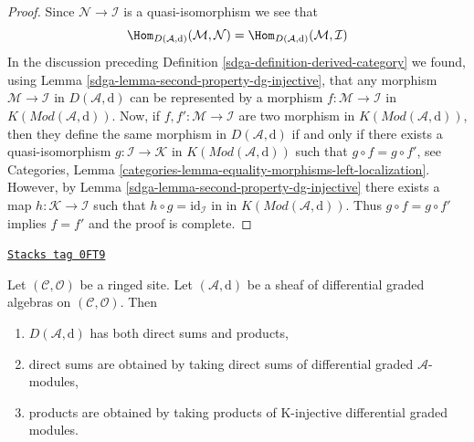 \begin{proof}

Since $\mathcal{N} \to \mathcal{I}$ is a quasi-isomorphism
we see that
$$
\Hom_{D(\mathcal{A}, \text{d})}(\mathcal{M}, \mathcal{N}) =
\Hom_{D(\mathcal{A}, \text{d})}(\mathcal{M}, \mathcal{I})
$$
In the discussion preceding Definition \ref{sdga-definition-derived-category}
we found, using Lemma \ref{sdga-lemma-second-property-dg-injective},
that any morphism $\mathcal{M} \to \mathcal{I}$
in $D(\mathcal{A}, \text{d})$ can be represented by a morphism
$f : \mathcal{M} \to \mathcal{I}$ in
$K(\textit{Mod}(\mathcal{A}, \text{d}))$.
Now, if $f, f' :  \mathcal{M} \to \mathcal{I}$ are two morphism in
$K(\textit{Mod}(\mathcal{A}, \text{d}))$, then they define
the same morphism in $D(\mathcal{A}, \text{d})$ if and only
if there exists a quasi-isomorphism $g : \mathcal{I} \to \mathcal{K}$
in $K(\textit{Mod}(\mathcal{A}, \text{d}))$
such that $g \circ f = g \circ f'$, see
Categories, Lemma \ref{categories-lemma-equality-morphisms-left-localization}.
However, by Lemma \ref{sdga-lemma-second-property-dg-injective} there
exists a map
$h : \mathcal{K} \to \mathcal{I}$
such that $h \circ g = \text{id}_\mathcal{I}$ in
in $K(\textit{Mod}(\mathcal{A}, \text{d}))$.
Thus $g \circ f = g \circ f'$ implies $f = f'$ and
the proof is complete.
\end{proof}

\begin{lemma}
\label{sdga-lemma-derived-products}
\href{https://stacks.math.columbia.edu/tag/0FT9}{\texttt{Stacks tag 0FT9}}

Let $(\mathcal{C}, \mathcal{O})$ be a ringed site. Let
$(\mathcal{A}, \text{d})$ be a sheaf of differential graded algebras
on $(\mathcal{C}, \mathcal{O})$. Then
\begin{enumerate}
\item $D(\mathcal{A}, \text{d})$ has both direct sums and products,
\item direct sums are obtained by taking direct sums of differential graded
$\mathcal{A}$-modules,
\item products are obtained by taking products of
K-injective differential graded modules.
\end{enumerate}
\end{lemma}


